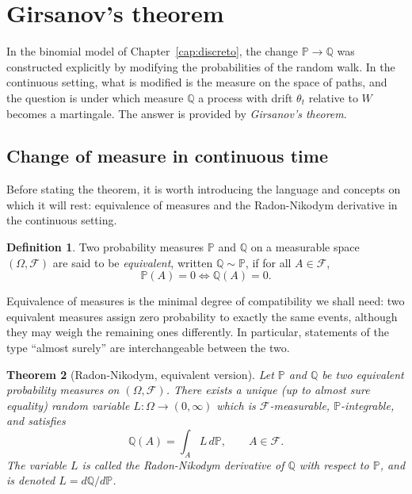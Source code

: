 \documentclass[11pt,a4paper,oneside]{report}
\theoremstyle{plain}
\newtheorem{teorema}{Theorem}[chapter]
\theoremstyle{definition}
\newtheorem{definicion}[teorema]{Definition}
\theoremstyle{remark}
\newcommand{\PP}{\mathbb{P}}
\newcommand{\Q}{\mathbb{Q}}
\newcommand{\F}{\mathcal{F}}
\newcommand{\1}{\mathbf{1}}
\begin{document}
\medskip
\section{Girsanov's theorem}
\label{sec:girsanov}

In the binomial model of Chapter~\ref{cap:discreto}, the change
$\PP \to \Q$ was constructed explicitly by modifying the
probabilities of the random walk. In the continuous setting, what is
modified is the measure on the space of paths, and the question is
under which measure $\Q$ a process with drift $\theta_t$ relative to
$W$ becomes a martingale. The answer is provided by \emph{Girsanov's
theorem}.

\subsection{Change of measure in continuous time}
\label{subsec:cambio_medida}

Before stating the theorem, it is worth introducing the language and
concepts on which it will rest: equivalence of measures and the
Radon-Nikodym derivative in the continuous setting.

\medskip

\begin{definicion}
\label{def:medidas_equivalentes}
Two probability measures $\PP$ and $\Q$ on a measurable space
$(\Omega, \F)$ are said to be \emph{equivalent}, written
$\Q \sim \PP$, if for all $A \in \F$,
\begin{equation*}
  \PP(A) = 0 \iff \Q(A) = 0.
\end{equation*}
\end{definicion}

Equivalence of measures is the minimal degree of compatibility we
shall need: two equivalent measures assign zero probability to
exactly the same events, although they may weigh the remaining ones
differently. In particular, statements of the type ``almost surely''
are interchangeable between the two.

\begin{teorema}[Radon-Nikodym, equivalent version]
\label{teo:radon_nikodym}
Let $\PP$ and $\Q$ be two equivalent probability measures on
$(\Omega, \F)$. There exists a unique (up to almost sure equality)
random variable $L : \Omega \to (0, \infty)$ which is
$\F$-measurable, $\PP$-integrable, and satisfies
\begin{equation}\label{eq:def_RN}
  \Q(A) = \int_A L\, d\PP, \qquad A \in \F.
\end{equation}
The variable $L$ is called the \emph{Radon-Nikodym derivative of $\Q$
with respect to $\PP$}, and is denoted $L = d\Q/d\PP$.
\end{teorema}
\end{document}
